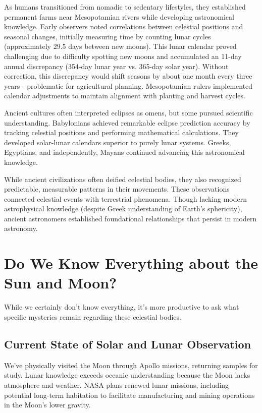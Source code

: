 \documentclass[12pt,oneside,a4paper,english]{article}
\begin{document}
As humans transitioned from nomadic to sedentary lifestyles, they established permanent farms near Mesopotamian rivers while developing astronomical knowledge. Early observers noted correlations between celestial positions and seasonal changes, initially measuring time by counting lunar cycles (approximately 29.5 days between new moons). This lunar calendar proved challenging due to difficulty spotting new moons and accumulated an 11-day annual discrepancy (354-day lunar year vs. 365-day solar year). Without correction, this discrepancy would shift seasons by about one month every three years - problematic for agricultural planning. Mesopotamian rulers implemented calendar adjustments to maintain alignment with planting and harvest cycles.\cite{meso1}

Ancient cultures often interpreted eclipses as omens, but some pursued scientific understanding. Babylonians achieved remarkable eclipse prediction accuracy by tracking celestial positions and performing mathematical calculations. They developed solar-lunar calendars superior to purely lunar systems. Greeks, Egyptians, and independently, Mayans continued advancing this astronomical knowledge.\cite{ancientobs}

While ancient civilizations often deified celestial bodies, they also recognized predictable, measurable patterns in their movements. These observations connected celestial events with terrestrial phenomena. Though lacking modern astrophysical knowledge (despite Greek understanding of Earth's sphericity), ancient astronomers established foundational relationships that persist in modern astronomy.

\section{Do We Know Everything about the Sun and Moon?}
While we certainly don't know everything, it's more productive to ask what specific mysteries remain regarding these celestial bodies.

\subsection{Current State of Solar and Lunar Observation}
We've physically visited the Moon through Apollo missions, returning samples for study. Lunar knowledge exceeds oceanic understanding because the Moon lacks atmosphere and weather. NASA plans renewed lunar missions, including potential long-term habitation to facilitate manufacturing and mining operations in the Moon's lower gravity.
\end{document}
